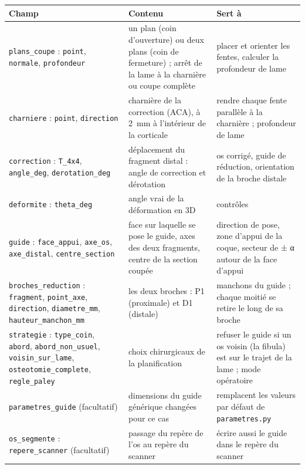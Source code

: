 \documentclass[11pt,a4paper]{article}
\newcommand{\champ}[1]{\texttt{\small #1}}
\begin{document}
\begin{longtable}{@{}>{\raggedright\arraybackslash}p{4.3cm}>{\raggedright\arraybackslash}p{5.4cm}>{\raggedright\arraybackslash}p{5.6cm}@{}}
\toprule
\textbf{Champ} & \textbf{Contenu} & \textbf{Sert à} \\ \midrule \endhead
\champ{plans\_coupe} : \champ{point}, \champ{normale}, \champ{profondeur}
  & un plan (coin d'ouverture) ou deux plans (coin de fermeture) ; arrêt de la lame à la charnière ou coupe complète
  & placer et orienter les fentes, calculer la profondeur de lame \\ \midrule
\champ{charniere} : \champ{point}, \champ{direction}
  & charnière de la correction (ACA), à 2~mm à l'intérieur de la corticale
  & rendre chaque fente parallèle à la charnière ; profondeur de lame \\ \midrule
\champ{correction} : \champ{T\_4x4}, \champ{angle\_deg}, \champ{derotation\_deg}
  & déplacement du fragment distal : angle de correction et dérotation
  & os corrigé, guide de réduction, orientation de la broche distale \\ \midrule
\champ{deformite} : \champ{theta\_deg}
  & angle vrai de la déformation en 3D
  & contrôles \\ \midrule
\champ{guide} : \champ{face\_appui}, \champ{axe\_os}, \champ{axe\_distal}, \champ{centre\_section}
  & face sur laquelle se pose le guide, axes des deux fragments, centre de la section coupée
  & direction de pose, zone d'appui de la coque, secteur de ± α autour de la face d'appui \\ \midrule
\champ{broches\_reduction} : \champ{fragment}, \champ{point\_axe}, \champ{direction}, \champ{diametre\_mm},
  \champ{hauteur\_manchon\_mm}
  & les deux broches : P1 (proximale) et D1 (distale)
  & manchons du guide ; chaque moitié se retire le long de sa broche \\ \midrule
\champ{strategie} : \champ{type\_coin}, \champ{abord}, \champ{abord\_non\_usuel}, \champ{voisin\_sur\_lame},
  \champ{osteotomie\_complete}, \champ{regle\_paley}
  & choix chirurgicaux de la planification
  & refuser le guide si un os voisin (la fibula) est sur le trajet de la lame ; mode opératoire \\ \midrule
\champ{parametres\_guide} (facultatif)
  & dimensions du guide générique changées pour ce cas
  & remplacent les valeurs par défaut de \champ{parametres.py} \\ \midrule
\champ{os\_segmente} : \champ{repere\_scanner} (facultatif)
  & passage du repère de l'os au repère du scanner
  & écrire aussi le guide dans le repère du scanner \\
\bottomrule
\end{longtable}
\end{document}
